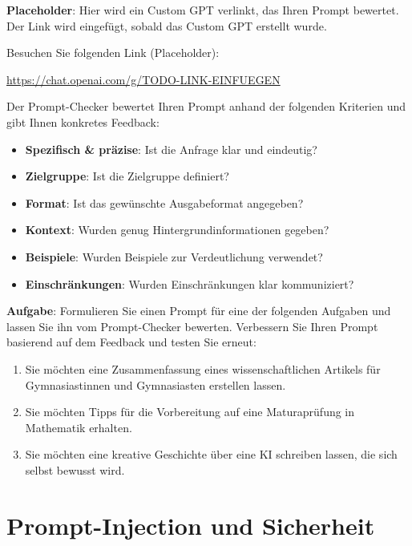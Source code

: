 \begin{myexercise}
\begin{myattention}
\textbf{Placeholder}: Hier wird ein Custom GPT verlinkt, das Ihren Prompt
bewertet. Der Link wird eingefügt, sobald das Custom GPT erstellt wurde.
\end{myattention}

Besuchen Sie folgenden Link (Placeholder):
\begin{center}
    \url{https://chat.openai.com/g/TODO-LINK-EINFUEGEN}
\end{center}

Der Prompt-Checker bewertet Ihren Prompt anhand der folgenden Kriterien
und gibt Ihnen konkretes Feedback:
\begin{itemize}
    \item \textbf{Spezifisch \& präzise}: Ist die Anfrage klar und eindeutig?
    \item \textbf{Zielgruppe}: Ist die Zielgruppe definiert?
    \item \textbf{Format}: Ist das gewünschte Ausgabeformat angegeben?
    \item \textbf{Kontext}: Wurden genug Hintergrundinformationen gegeben?
    \item \textbf{Beispiele}: Wurden Beispiele zur Verdeutlichung verwendet?
    \item \textbf{Einschränkungen}: Wurden Einschränkungen klar kommuniziert?
\end{itemize}

\textbf{Aufgabe}: Formulieren Sie einen Prompt für eine der folgenden Aufgaben
und lassen Sie ihn vom Prompt-Checker bewerten. Verbessern Sie Ihren Prompt
basierend auf dem Feedback und testen Sie erneut:

\begin{enumerate}
    \item Sie möchten eine Zusammenfassung eines wissenschaftlichen Artikels
          für Gymnasiastinnen und Gymnasiasten erstellen lassen.
    \item Sie möchten Tipps für die Vorbereitung auf eine Maturaprüfung
          in Mathematik erhalten.
    \item Sie möchten eine kreative Geschichte über eine KI schreiben lassen,
          die sich selbst bewusst wird.
\end{enumerate}
\end{myexercise}

\section{Prompt-Injection und Sicherheit}


